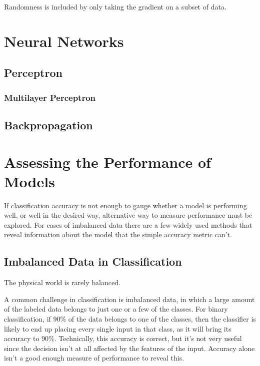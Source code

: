 Randomness is included by only taking the gradient on a subset of data.

\section{Neural Networks}
\subsection{Perceptron}

\subsubsection{Multilayer Perceptron}

\subsection{Backpropagation}

\section{Assessing the Performance of Models}
If classification accuracy is not enough to gauge whether a model is
performing well, or well in the desired way, alternative way to measure
performance must be explored. For cases of imbalanced data there are a few
widely used methods that reveal information about the model that the simple
accuracy metric can't.

\subsection{Imbalanced Data in Classification}
The physical world is rarely balanced.

A common challenge in classification is imbalanced data, in which a large
amount of the labeled data belongs to just one or a few of the classes.
For binary classification, if 90\% of the data belongs to one of the classes,
then the classifier is likely to end up placing every single
input in that class, as it will bring its accuracy to 90\%. Technically, this
accuracy is correct, but it's not very useful since the decision isn't at all
affected by the features of the input. Accuracy alone isn't a good enough
measure of performance to reveal this.

